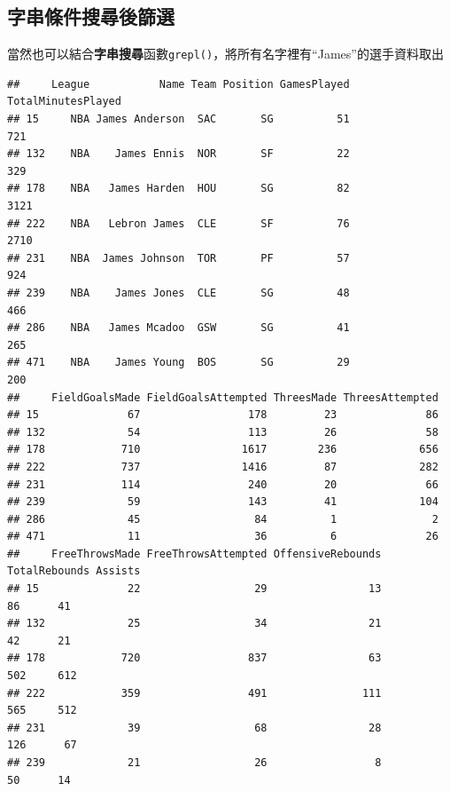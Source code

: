\documentclass[]{book}
\newenvironment{Shaded}{\begin{snugshade}}{\end{snugshade}}
\newcommand{\KeywordTok}[1]{\textcolor[rgb]{0.13,0.29,0.53}{\textbf{{#1}}}}
\newcommand{\StringTok}[1]{\textcolor[rgb]{0.31,0.60,0.02}{{#1}}}
\newcommand{\NormalTok}[1]{{#1}}
\theoremstyle{definition}
\theoremstyle{definition}
\theoremstyle{remark}
\begin{document}
\subsection{字串條件搜尋後篩選}

當然也可以結合\textbf{字串搜尋}函數\texttt{grepl()}，將所有名字裡有``James''的選手資料取出

\begin{Shaded}
\end{Shaded}

\begin{verbatim}
##     League           Name Team Position GamesPlayed TotalMinutesPlayed
## 15     NBA James Anderson  SAC       SG          51                721
## 132    NBA    James Ennis  NOR       SF          22                329
## 178    NBA   James Harden  HOU       SG          82               3121
## 222    NBA   Lebron James  CLE       SF          76               2710
## 231    NBA  James Johnson  TOR       PF          57                924
## 239    NBA    James Jones  CLE       SG          48                466
## 286    NBA   James Mcadoo  GSW       SG          41                265
## 471    NBA    James Young  BOS       SG          29                200
##     FieldGoalsMade FieldGoalsAttempted ThreesMade ThreesAttempted
## 15              67                 178         23              86
## 132             54                 113         26              58
## 178            710                1617        236             656
## 222            737                1416         87             282
## 231            114                 240         20              66
## 239             59                 143         41             104
## 286             45                  84          1               2
## 471             11                  36          6              26
##     FreeThrowsMade FreeThrowsAttempted OffensiveRebounds TotalRebounds Assists
## 15              22                  29                13            86      41
## 132             25                  34                21            42      21
## 178            720                 837                63           502     612
## 222            359                 491               111           565     512
## 231             39                  68                28           126      67
## 239             21                  26                 8            50      14

\end{verbatim}
\end{document}

